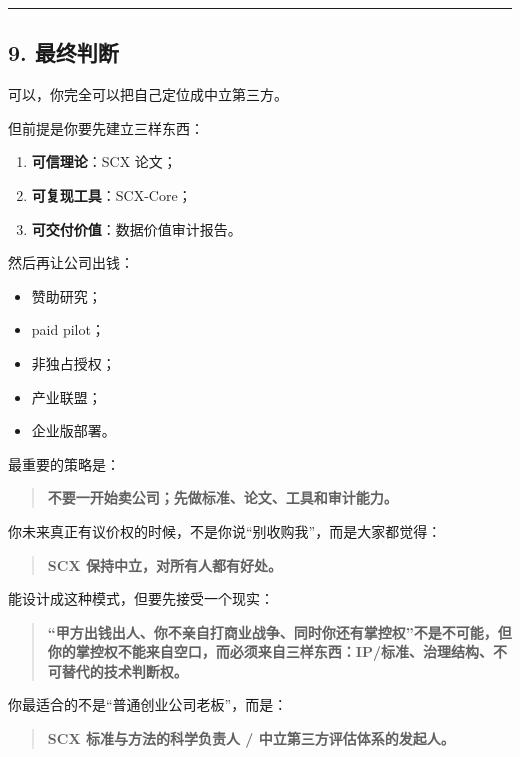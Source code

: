 \documentclass[
  12pt,
]{ctexart}
\providecommand{\tightlist}{%
  \setlength{\itemsep}{0pt}\setlength{\parskip}{0pt}}
\begin{document}
\begin{center}\rule{0.5\linewidth}{0.5pt}\end{center}

\subsection{9. 最终判断}\label{ux6700ux7ec8ux5224ux65ad}

可以，你完全可以把自己定位成中立第三方。

但前提是你要先建立三样东西：

\begin{enumerate}
\def\labelenumi{\arabic{enumi}.}
\tightlist
\item
  \textbf{可信理论}：SCX 论文；
\item
  \textbf{可复现工具}：SCX-Core；
\item
  \textbf{可交付价值}：数据价值审计报告。
\end{enumerate}

然后再让公司出钱：

\begin{itemize}
\tightlist
\item
  赞助研究；
\item
  paid pilot；
\item
  非独占授权；
\item
  产业联盟；
\item
  企业版部署。
\end{itemize}

最重要的策略是：

\begin{quote}
\textbf{不要一开始卖公司；先做标准、论文、工具和审计能力。}
\end{quote}

你未来真正有议价权的时候，不是你说``别收购我''，而是大家都觉得：

\begin{quote}
\textbf{SCX 保持中立，对所有人都有好处。}
\end{quote}

能设计成这种模式，但要先接受一个现实：

\begin{quote}
\textbf{``甲方出钱出人、你不亲自打商业战争、同时你还有掌控权''不是不可能，但你的掌控权不能来自空口，而必须来自三样东西：IP/标准、治理结构、不可替代的技术判断权。}
\end{quote}

你最适合的不是``普通创业公司老板''，而是：

\begin{quote}
\textbf{SCX 标准与方法的科学负责人 / 中立第三方评估体系的发起人。}
\end{quote}
\end{document}
